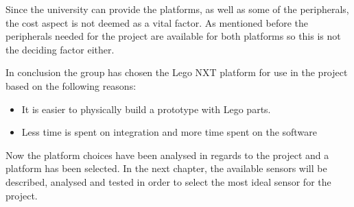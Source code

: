 Since the university can provide the platforms, as well as some of the
peripherals, the cost aspect is not deemed as a vital factor. As mentioned
before the peripherals needed for the project are available for both platforms
so this is not the deciding factor either.\nl

In conclusion the group has chosen the Lego NXT platform for use in the project
based on the following reasons:
\begin{itemize}
  \item It is easier to physically build a prototype with Lego parts.
  \item Less time is spent on integration and more time spent on the software
\end{itemize}

Now the platform choices have been analysed in regards to the project and a
platform has been selected. In the next chapter, the available sensors will be
described, analysed and tested in order to select the most ideal sensor for the
project.

